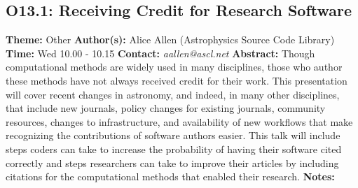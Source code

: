 \documentclass{report}
\begin{document}
{{{{{\subsection*{O13.1: Receiving Credit for Research Software}
{\bf Theme:}  Other\newline
{\bf Author(s):}\newline
Alice Allen (Astrophysics Source Code Library) \newline   \newline   \newline   \newline  \newline  \newline\newline
{\bf Time:} Wed 10.00 - 10.15\newline
\newline
{\bf Contact:} {\it aallen@ascl.net}\newline
\newline\newline
{\bf Abstract:}\newline
Though computational methods are widely used in many disciplines, those who author these methods have not always received credit for their work. This presentation will cover recent changes in astronomy, and indeed, in many other disciplines, that include new journals, policy changes for existing journals, community resources, changes to infrastructure, and availability of new workflows that make recognizing the contributions of software authors easier. This talk will include steps coders can take to increase the probability of having their software cited correctly and steps researchers can take to improve their articles by including citations for the computational methods that enabled their research.\newline
{\bf Notes:}\newline
{\newpage
}}}}}}
\end{document}
